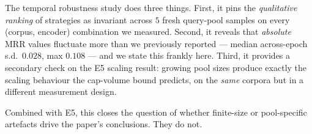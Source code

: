 The temporal robustness study does three things. First, it pins the
\emph{qualitative ranking} of strategies as invariant across $5$
fresh query-pool samples on every (corpus, encoder) combination we
measured. Second, it reveals that \emph{absolute} MRR values
fluctuate more than we previously reported --- median across-epoch
s.d.\ $0.028$, max $0.108$ --- and we state this frankly here.
Third, it provides a secondary check on the E5 scaling result:
growing pool sizes produce exactly the scaling behaviour the
cap-volume bound predicts, on the \emph{same} corpora but in a
different measurement design.

Combined with E5, this closes the question of whether finite-size
or pool-specific artefacts drive the paper's conclusions. They
do not.
